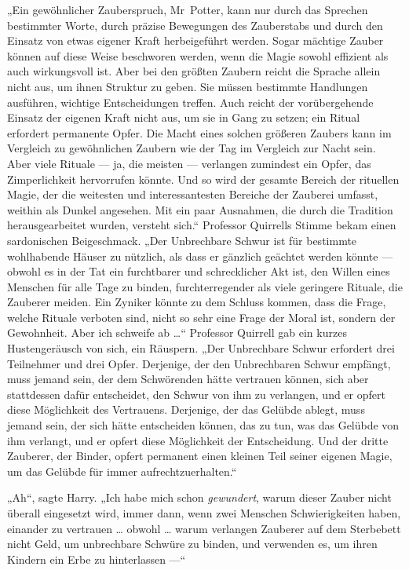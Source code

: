 „Ein gewöhnlicher Zauberspruch, Mr~Potter, kann nur durch das Sprechen bestimmter Worte, durch präzise Bewegungen des Zauberstabs und durch den Einsatz von etwas eigener Kraft herbeigeführt werden. Sogar mächtige Zauber können auf diese Weise beschworen werden, wenn die Magie sowohl effizient als auch wirkungsvoll ist. Aber bei den größten Zaubern reicht die Sprache allein nicht aus, um ihnen Struktur zu geben. Sie müssen bestimmte Handlungen ausführen, wichtige Entscheidungen treffen. Auch reicht der vorübergehende Einsatz der eigenen Kraft nicht aus, um sie in Gang zu setzen; ein Ritual erfordert permanente Opfer. Die Macht eines solchen größeren Zaubers kann im Vergleich zu gewöhnlichen Zaubern wie der Tag im Vergleich zur Nacht sein. Aber viele Rituale — ja, die meisten — verlangen zumindest ein Opfer, das Zimperlichkeit hervorrufen könnte. Und so wird der gesamte Bereich der rituellen Magie, der die weitesten und interessantesten Bereiche der Zauberei umfasst, weithin als Dunkel angesehen. Mit ein paar Ausnahmen, die durch die Tradition herausgearbeitet wurden, versteht sich.“ Professor Quirrells Stimme bekam einen sardonischen Beigeschmack.
„Der Unbrechbare Schwur ist für bestimmte wohlhabende Häuser zu nützlich, als dass er gänzlich geächtet werden könnte — obwohl es in der Tat ein furchtbarer und schrecklicher Akt ist, den Willen eines Menschen für alle Tage zu binden, furchterregender als viele geringere Rituale, die Zauberer meiden. Ein Zyniker könnte zu dem Schluss kommen, dass die Frage, welche Rituale verboten sind, nicht so sehr eine Frage der Moral ist, sondern der Gewohnheit. Aber ich schweife ab …“ Professor Quirrell gab ein kurzes Hustengeräusch von sich, ein Räuspern.
„Der Unbrechbare Schwur erfordert drei Teilnehmer und drei Opfer. Derjenige, der den Unbrechbaren Schwur empfängt, muss jemand sein, der dem Schwörenden hätte vertrauen können, sich aber stattdessen dafür entscheidet, den Schwur von ihm zu verlangen, und er opfert diese Möglichkeit des Vertrauens. Derjenige, der das Gelübde ablegt, muss jemand sein, der sich hätte entscheiden können, das zu tun, was das Gelübde von ihm verlangt, und er opfert diese Möglichkeit der Entscheidung. Und der dritte Zauberer, der Binder, opfert permanent einen kleinen Teil seiner eigenen Magie, um das Gelübde für immer aufrechtzuerhalten.“

„Ah“, sagte Harry.
„Ich habe mich schon \emph{gewundert}, warum dieser Zauber nicht überall eingesetzt wird, immer dann, wenn zwei Menschen Schwierigkeiten haben, einander zu vertrauen … obwohl … warum verlangen Zauberer auf dem Sterbebett nicht Geld, um unbrechbare Schwüre zu binden, und verwenden es, um ihren Kindern ein Erbe zu hinterlassen —“

